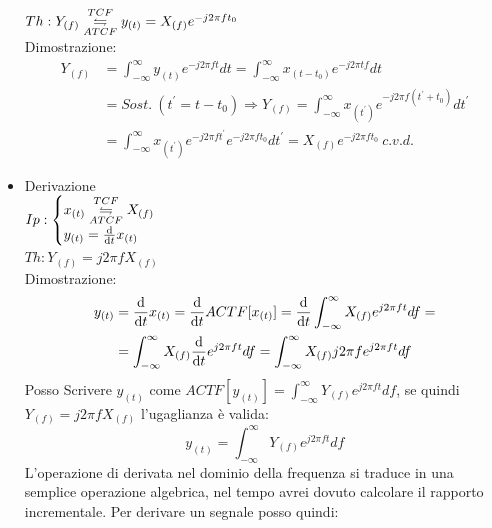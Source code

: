 \begin{itemize}
{                    $Th: Y_{(f)} \overunderset{TCF}{ATCF}{\leftrightharpoons} y_{(t)} = X_{(f)}e^{-j2\pi ft_0}$\\ 
                    Dimostrazione:
                    \begin{align}
                        Y_{(f)} & = \int_{-\infty}^{\infty} y_{(t)} e^{-j2\pi ft} dt = \int_{-\infty}^{\infty} x_{(t-t_0)} e^{-j2\pi tf} dt \nonumber \\
                                & =Sost.\ (t^\prime = t-t_0) \Rightarrow  Y_{(f)} = \int_{-\infty}^{\infty} x_{(t^\prime)} e^{-j2\pi f(t^\prime+t_0)} dt^\prime \nonumber \\
                                & =\int_{-\infty}^{\infty} x_{(t^\prime)} e^{-j2\pi ft^\prime}e^{-j2\pi ft_0} dt^\prime= X_{(f)}e^{-j2\pi ft_0}\ c.v.d.  \nonumber
                    \end{align}
                }
                \item{Derivazione\\
                    $Ip:\begin{cases}
                        x_{(t)}\overunderset{TCF}{ATCF}{\leftrightharpoons} X_{(f)}\\
                        y_{(t)}= \derivative{}{t} x_{(t)}        
                    \end{cases}$\\
                    $Th: Y_{(f)} = j2\pi f X_{(f)} $ \\
                    Dimostrazione:\\
                    \begin{align}
                        y_{(t)} &= \derivative{}{t} x_{(t)} = \derivative{}{t} ACTF[x_{(t)}] =\derivative{}{t} \int_{-\infty}^{\infty} X_{(f)}e^{j2\pi ft} df = \nonumber\\
                                &= \int_{-\infty}^{\infty} X_{(f)}\derivative{}{t}e^{j2\pi ft} df = \int_{-\infty}^{\infty} X_{(f)}j2\pi fe^{j2\pi ft} df \nonumber
                    \end{align}
                    Posso Scrivere $y_{(t)}$ come $ACTF[y_{(t)}] = \int_{-\infty}^{\infty} Y_{(f)}e^{j2\pi ft} df $, se quindi $Y_{(f)} = j2\pi f X_{(f)}$ l'ugaglianza è valida:
                    \[
                        y_{(t)} =\int_{-\infty}^{\infty} Y_{(f)}e^{j2\pi ft} df
                    \]
                    L'operazione di derivata nel dominio della frequenza si traduce in una semplice operazione algebrica, nel tempo avrei dovuto calcolare il 
                    rapporto incrementale. Per derivare un segnale posso quindi:
}
\end{itemize}
